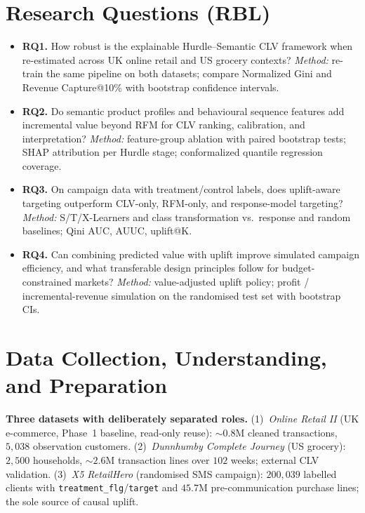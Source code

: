 \documentclass[pdflatex,sn-mathphys-num]{sn-jnl}
\begin{document}
\section{Research Questions (RBL)}\label{sec:rq}
\begin{itemize}
\item \textbf{RQ1.} How robust is the explainable Hurdle--Semantic CLV framework when re-estimated
      across UK online retail and US grocery contexts? \emph{Method:} re-train the same pipeline on
      both datasets; compare Normalized Gini and Revenue Capture@10\% with bootstrap confidence
      intervals.
\item \textbf{RQ2.} Do semantic product profiles and behavioural sequence features add incremental
      value beyond RFM for CLV ranking, calibration, and interpretation? \emph{Method:}
      feature-group ablation with paired bootstrap tests; SHAP attribution per Hurdle stage;
      conformalized quantile regression coverage.
\item \textbf{RQ3.} On campaign data with treatment/control labels, does uplift-aware targeting
      outperform CLV-only, RFM-only, and response-model targeting? \emph{Method:} S/T/X-Learners and
      class transformation vs.\ response and random baselines; Qini AUC, AUUC, uplift@K.
\item \textbf{RQ4.} Can combining predicted value with uplift improve simulated campaign efficiency,
      and what transferable design principles follow for budget-constrained markets?
      \emph{Method:} value-adjusted uplift policy; profit / incremental-revenue simulation on the
      randomised test set with bootstrap CIs.
\end{itemize}

\section{Data Collection, Understanding, and Preparation}\label{sec:data}
\textbf{Three datasets with deliberately separated roles.}
(1)~\emph{Online Retail II} (UK e-commerce, Phase~1 baseline, read-only reuse): $\sim 0.8$M cleaned
transactions, $5{,}038$ observation customers.
(2)~\emph{Dunnhumby Complete Journey} (US grocery): $2{,}500$ households, $\sim 2.6$M transaction
lines over $102$ weeks; external CLV validation.
(3)~\emph{X5 RetailHero} (randomised SMS campaign): $200{,}039$ labelled clients with
\texttt{treatment\_flg}/\texttt{target} and $45.7$M pre-communication purchase lines; the sole
source of causal uplift.
\end{document}
